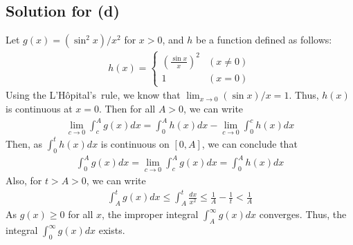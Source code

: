 \documentclass{scrartcl}
\begin{document}
\subsection{Solution for (d)}
Let \(g(x) = (\sin^2 x) / x^2\) for \(x > 0\), and \(h\) be a function defined
as follows:
\begin{align*}
  h(x) = \begin{cases}
    \left( \frac{\sin x}{x} \right)^2 & (x \not = 0) \\
    1 & (x = 0)
  \end{cases}
\end{align*}
Using the L'Hôpital's~rule, we know that \(\lim_{x \to 0} (\sin x) / x = 1\).
Thus, \(h(x)\) is continuous at \(x = 0\). Then for all \(A > 0\), we can write
\begin{align*}
  \lim_{c \to 0} \int^A_c g(x) dx
  = \int^A_0 h(x) dx - \lim_{c \to 0} \int^c_0 h(x) dx
\end{align*}
Then, as \(\int^t_0 h(x) dx\) is continuous on \([0, A]\), we can conclude that
\begin{align*}
  \int^A_0 g(x) dx
  = \lim_{c \to 0} \int^A_c g(x) dx
  = \int^A_0 h(x) dx
\end{align*}
Also, for \(t > A > 0\), we can write
\begin{align*}
  \int^t_A g(x) dx
  \le \int^t_A \frac{dx}{x^2}
  \le \frac{1}{A} - \frac{1}{t}
  < \frac{1}{A}
\end{align*}
As \(g(x) \ge 0\) for all \(x\), the improper integral \(\int^\infty_A g(x)
dx\) converges. Thus, the integral \(\int^\infty_0 g(x) dx\) exists.
\end{document}
